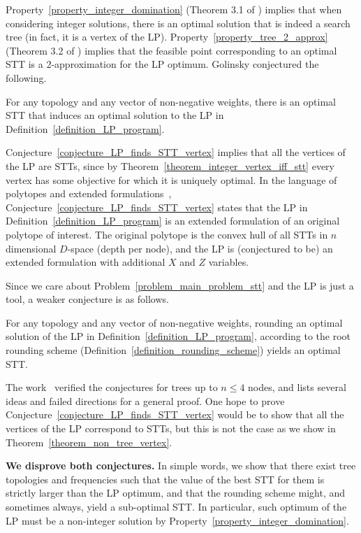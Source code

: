 Property~\ref{property_integer_domination} (Theorem 3.1 of \cite{GolinskyThesis}) implies that when considering integer solutions, there is an optimal solution that is indeed a search tree (in fact, it is a vertex of the LP). Property~\ref{property_tree_2_approx} (Theorem 3.2 of \cite{GolinskyThesis}) implies that the feasible point corresponding to an optimal STT is a $2$-approximation for the LP optimum. Golinsky \cite{GolinskyThesis} conjectured the following.

\begin{conjecture}
\label{conjecture_LP_finds_STT_vertex}
For any topology and any vector of non-negative weights, there is an optimal STT that induces an optimal solution to the LP in Definition~\ref{definition_LP_program}.
\end{conjecture}

Conjecture~\ref{conjecture_LP_finds_STT_vertex} implies that all the vertices of the LP are STTs, since by Theorem~\ref{theorem_integer_vertex_iff_stt} every vertex has some objective for which it is uniquely optimal.
In the language of polytopes and extended formulations~\cite{ExtendedFormulationSurvey}, Conjecture~\ref{conjecture_LP_finds_STT_vertex} states that the LP in Definition~\ref{definition_LP_program} is an extended formulation of an original polytope of interest. The original polytope is the convex hull of all STTs in $n$ dimensional $D$-space (depth per node), and the LP is (conjectured to be) an extended formulation with additional $X$ and $Z$ variables.

Since we care about Problem~\ref{problem_main_problem_stt} and the LP is just a tool, a weaker conjecture is as follows.

\begin{conjecture}
\label{conjecture_LP_rounding_finds_opt_STT}
For any topology and any vector of non-negative weights, rounding an optimal solution of the LP in Definition~\ref{definition_LP_program}, according to the root rounding scheme (Definition~\ref{definition_rounding_scheme}) yields an optimal STT.
\end{conjecture}

The work~\cite{GolinskyThesis} verified the conjectures for trees up to $n \le 4$ nodes, and lists several ideas and failed directions for a general proof. One hope to prove Conjecture~\ref{conjecture_LP_finds_STT_vertex} would be to show that all the vertices of the LP correspond to STTs, but this is not the case as we show in Theorem~\ref{theorem_non_tree_vertex}.

\textbf{We disprove both conjectures.} In simple words, we show that there exist tree topologies and frequencies such that the value of the best STT for them is strictly larger than the LP optimum, and that the rounding scheme might, and sometimes always, yield a sub-optimal STT. In particular, such optimum of the LP must be a non-integer solution by Property~\ref{property_integer_domination}.
